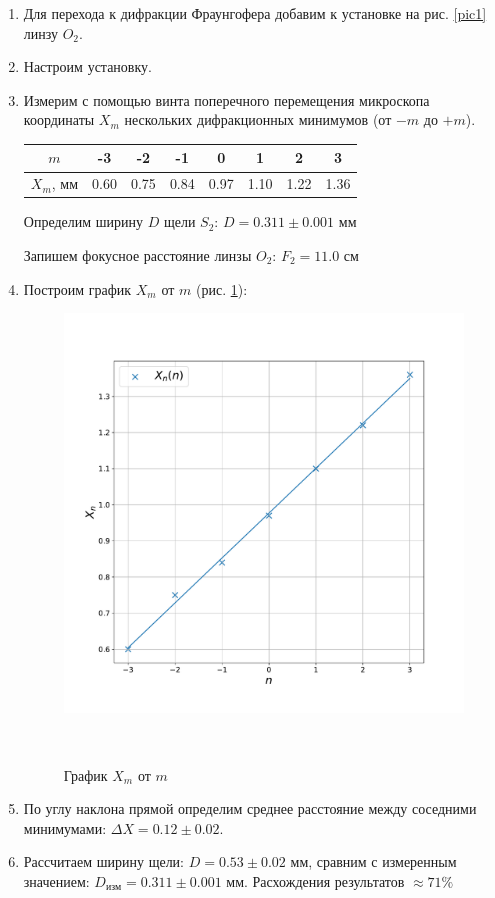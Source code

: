 \documentclass[a4paper, 12pt]{article}
\begin{document}
\begin{enumerate}
    \item Для перехода к дифракции Фраунгофера добавим к установке на рис. \ref{pic1} линзу $O_2$.

    \item Настроим установку.

    \item Измерим с помощью винта поперечного перемещения микроскопа координаты $X_m$ нескольких дифракционных минимумов (от $-m$ до $+m$).
    
    \begin{tabular}{|c|c|c|c|c|c|c|c|} \hline
        $m$ & -3 & -2 & -1 & 0 & 1 & 2 & 3\\ \hline
        $X_m$, мм & 0.60 & 0.75 & 0.84 & 0.97 & 1.10 & 1.22 & 1.36 \\ \hline 
    \end{tabular}

    Определим ширину $D$ щели $S_2$: $D = 0.311 \pm 0.001$ мм

    Запишем фокусное расстояние линзы $O_2$: $F_2 = 11.0$ см

    \item Построим график $X_m$ от $m$ (рис. \ref{graph2}):
    
    \begin{figure}[!h]
        \centering
        \includegraphics[scale=0.4]{graph2}
        \caption{График $X_m$ от $m$}\
        \label{graph2}
    \end{figure}

    \item По углу наклона прямой определим среднее расстояние между соседними минимумами: $\Delta X = 0.12 \pm 0.02$.

    \item Рассчитаем ширину щели: $D = 0.53 \pm 0.02$ мм, сравним с измеренным значением: $D_{изм} = 0.311 \pm 0.001$ мм. Расхождения результатов $\approx 71 \%$
\end{enumerate}
\end{document}
